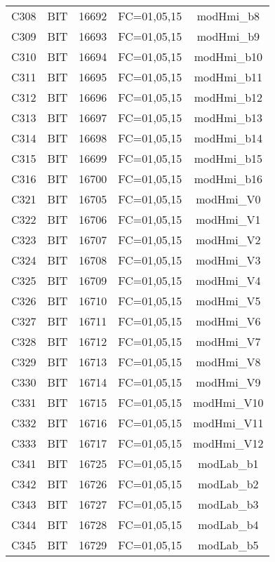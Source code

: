 \begin{center}
\begin{longtable}[c]{ |c|c|c|c|c| }
        C308	&	BIT	&	16692	&	FC=01,05,15	&	modHmi\_b8\\
        C309	&	BIT	&	16693	&	FC=01,05,15	&	modHmi\_b9\\
        C310	&	BIT	&	16694	&	FC=01,05,15	&	modHmi\_b10\\
        C311	&	BIT	&	16695	&	FC=01,05,15	&	modHmi\_b11\\
        C312	&	BIT	&	16696	&	FC=01,05,15	&	modHmi\_b12\\
        C313	&	BIT	&	16697	&	FC=01,05,15	&	modHmi\_b13\\
        C314	&	BIT	&	16698	&	FC=01,05,15	&	modHmi\_b14\\
        C315	&	BIT	&	16699	&	FC=01,05,15	&	modHmi\_b15\\
        C316	&	BIT	&	16700	&	FC=01,05,15	&	modHmi\_b16\\
        C321	&	BIT	&	16705	&	FC=01,05,15	&	modHmi\_V0\\
        C322	&	BIT	&	16706	&	FC=01,05,15	&	modHmi\_V1\\
        C323	&	BIT	&	16707	&	FC=01,05,15	&	modHmi\_V2\\
        C324	&	BIT	&	16708	&	FC=01,05,15	&	modHmi\_V3\\
        C325	&	BIT	&	16709	&	FC=01,05,15	&	modHmi\_V4\\
        C326	&	BIT	&	16710	&	FC=01,05,15	&	modHmi\_V5\\
        C327	&	BIT	&	16711	&	FC=01,05,15	&	modHmi\_V6\\
        C328	&	BIT	&	16712	&	FC=01,05,15	&	modHmi\_V7\\
        C329	&	BIT	&	16713	&	FC=01,05,15	&	modHmi\_V8\\
        C330	&	BIT	&	16714	&	FC=01,05,15	&	modHmi\_V9\\
        C331	&	BIT	&	16715	&	FC=01,05,15	&	modHmi\_V10\\
        C332	&	BIT	&	16716	&	FC=01,05,15	&	modHmi\_V11\\
        C333	&	BIT	&	16717	&	FC=01,05,15	&	modHmi\_V12\\
        C341	&	BIT	&	16725	&	FC=01,05,15	&	modLab\_b1\\
        C342	&	BIT	&	16726	&	FC=01,05,15	&	modLab\_b2\\
        C343	&	BIT	&	16727	&	FC=01,05,15	&	modLab\_b3\\
        C344	&	BIT	&	16728	&	FC=01,05,15	&	modLab\_b4\\
        C345	&	BIT	&	16729	&	FC=01,05,15	&	modLab\_b5\\

\end{longtable}
\end{center}
